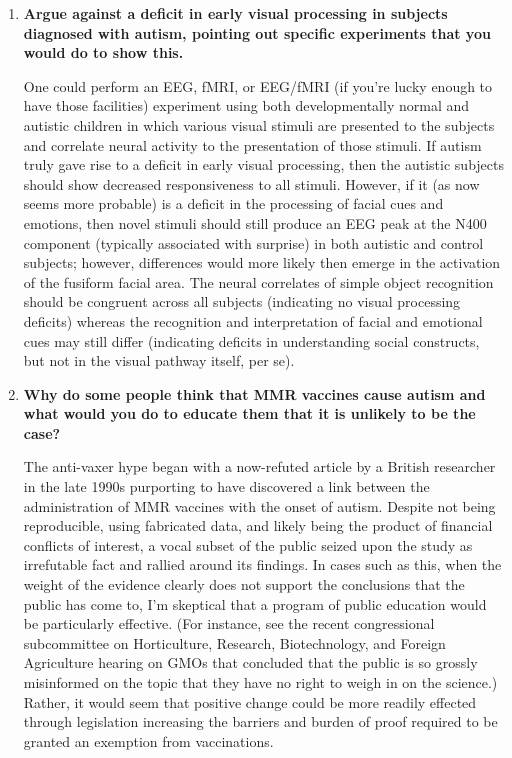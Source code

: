 \documentclass[11pt,final] {article}
\begin{document}
\begin{enumerate}
	\item {\bfseries Argue against a deficit in early visual processing in subjects diagnosed with autism, pointing out specific experiments that you would do to show this.}
	
	One could perform an EEG, fMRI, or EEG/fMRI (if you're lucky enough to have those facilities) experiment using both developmentally normal and autistic children in which various visual stimuli are presented to the subjects and correlate neural activity to the presentation of those stimuli. If autism truly gave rise to a deficit in early visual processing, then the autistic subjects should show decreased responsiveness to all stimuli. However, if it (as now seems more probable) is a deficit in the processing of facial cues and emotions, then novel stimuli should still produce an EEG peak at the N400 component (typically associated with surprise) in both autistic and control subjects; however, differences would more likely then emerge in the activation of the fusiform facial area. The neural correlates of simple object recognition should be congruent across all subjects (indicating no visual processing deficits) whereas the recognition and interpretation of facial and emotional cues may still differ (indicating deficits in understanding social constructs, but not in the visual pathway itself, per se).
	
	\item {\bfseries Why do some people think that MMR vaccines cause autism and what would you do to educate them that it is unlikely to be the case?}
	
	The anti-vaxer hype began with a now-refuted article by a British researcher in the late 1990s purporting to have discovered a link between the administration of MMR vaccines with the onset of autism. Despite not being reproducible, using fabricated data, and likely being the product of financial conflicts of interest, a vocal subset of the public seized upon the study as irrefutable fact and rallied around its findings. In cases such as this, when the weight of the evidence clearly does not support the conclusions that the public has come to, I'm skeptical that a program of public education would be particularly effective. (For instance, see the recent congressional subcommittee on Horticulture, Research, Biotechnology, and Foreign Agriculture hearing on GMOs that concluded that the public is so grossly misinformed on the topic that they have no right to weigh in on the science.) Rather, it would seem that positive change could be more readily effected through legislation increasing the barriers and burden of proof required to be granted an exemption from vaccinations.
\end{enumerate}
\end{document}
